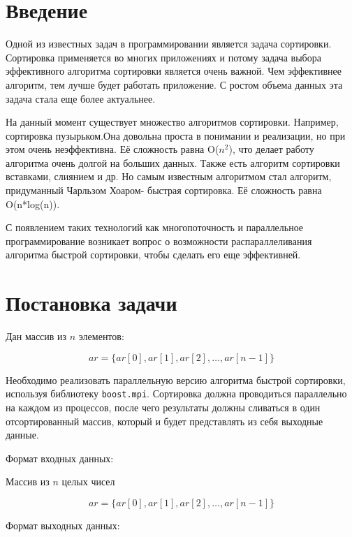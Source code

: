 \documentclass{report}
\begin{document}
\setcounter{page}{2}
\tableofcontents

\newpage

\newpage

\section*{Введение}

Одной из известных задач в программировании является задача сортировки. Сортировка применяется во многих приложениях и потому задача выбора эффективного алгоритма сортировки является очень важной. Чем эффективнее алгоритм, тем лучше будет работать приложение. С ростом объема данных эта задача стала еще более актуальнее.

На данный момент существует множество алгоритмов сортировки. Например, сортировка пузырьком.Она довольна проста в понимании и реализации, но при этом очень неэффективна. Её сложность равна O($n^2$), что делает работу алгоритма очень долгой на больших данных. Также есть алгоритм сортировки вставками, слиянием и др. Но самым известным алгоритмом стал алгоритм, придуманный Чарльзом Хоаром- быстрая сортировка. Её сложность равна O(n*log(n)). 

С появлением таких технологий как многопоточность и параллельное программирование возникает вопрос о возможности распараллеливания алгоритма быстрой сортировки, чтобы сделать его еще эффективней.

\newpage

\section*{Постановка задачи}  

Дан массив из $n$ элементов:

\[
ar = \{ ar[0], ar[1], ar[2], \dots, ar[n-1] \}
\]

Необходимо реализовать параллельную версию алгоритма быстрой сортировки, используя библиотеку \texttt{boost.mpi}. Сортировка должна проводиться параллельно на каждом из процессов, после чего результаты должны сливаться в один отсортированный массив, который и будет представлять из себя выходные данные.

Формат входных данных:

Массив из $n$ целых чисел

\[
ar = \{ ar[0], ar[1], ar[2], \dots, ar[n-1] \}
\]

Формат выходных данных:
\end{document}
